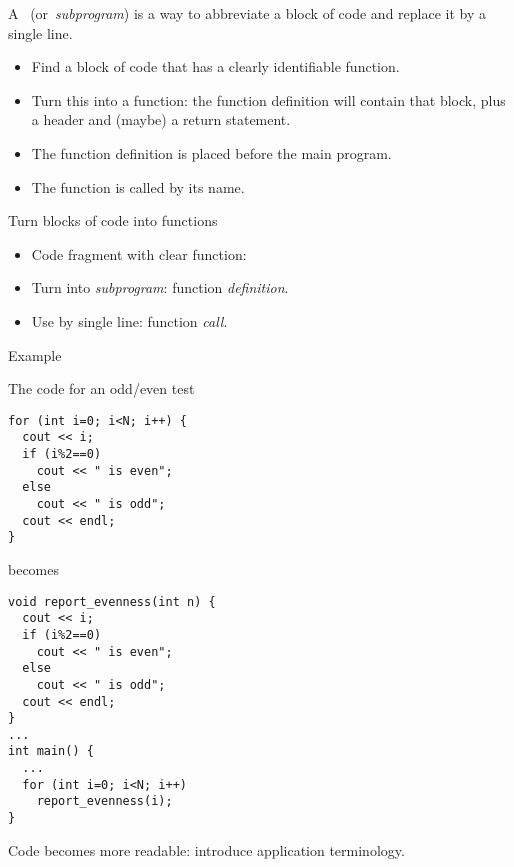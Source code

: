 
A~
(or~\emph{subprogram}) is a way to
abbreviate a block of code and replace it by a single line.

\begin{itemize}
\item Find a block of code that has a clearly identifiable function.
\item Turn this into a function: the function definition will contain
  that block, plus a header and (maybe) a return statement.
\item The function definition is placed before the main program.
\item The function is called by its name.
\end{itemize}

\begin{slide}{Turn blocks of code into functions}
  \label{sl:function-intro}
  \begin{itemize}
  \item Code fragment with clear function:
  \item Turn into \emph{subprogram}: function \emph{definition}.
  \item Use by single line: function \emph{call}.
  \end{itemize}
\end{slide}

\begin{block}{Example}
  \label{sl:function-example}
  \begin{multicols}{2}
    \small
    The code for an odd/even test
\begin{verbatim}
for (int i=0; i<N; i++) {
  cout << i;
  if (i%2==0)
    cout << " is even";
  else
    cout << " is odd";
  cout << endl;
}
\end{verbatim}
\vfill\columnbreak
becomes
\begin{verbatim}
void report_evenness(int n) {
  cout << i;
  if (i%2==0)
    cout << " is even";
  else
    cout << " is odd";
  cout << endl;
}
...
int main() {
  ...
  for (int i=0; i<N; i++)
    report_evenness(i);
}
\end{verbatim}
  \end{multicols}
Code becomes more readable: introduce application terminology.
\end{block}

